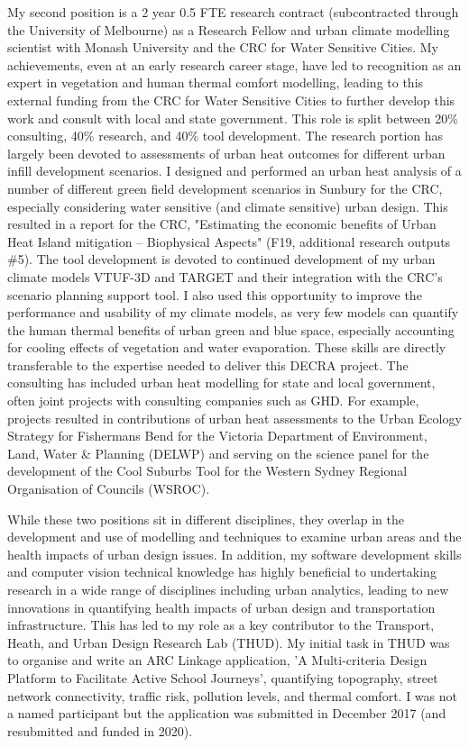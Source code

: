 My second position is a 2 year 0.5 FTE research contract (subcontracted through the University of Melbourne) as a Research Fellow and urban climate modelling scientist with Monash University and the CRC for Water Sensitive Cities. My achievements, even at an early research career stage, have led to recognition as an expert in vegetation and human thermal comfort modelling, leading to this external funding from the CRC for Water Sensitive Cities to further develop this work and consult with local and state government. This role is split between 20\% consulting, 40\% research, and 40\% tool development. The research portion has largely been devoted to assessments of urban heat outcomes for different urban infill development scenarios. I designed and performed an urban heat analysis of a number of different green field development scenarios in Sunbury for the CRC, especially considering water sensitive (and climate sensitive) urban design. This resulted in a report for the CRC, "Estimating the economic benefits of Urban Heat Island mitigation – Biophysical Aspects" (F19, additional research outputs \#5). The tool development is devoted to continued development of my urban climate models VTUF-3D and TARGET and their integration with the CRC's scenario planning support tool. I also used this opportunity to improve the performance and usability of my climate models, as very few models can quantify the human thermal benefits of urban green and blue space, especially accounting for cooling effects of vegetation and water evaporation. These skills are directly transferable to the expertise needed to deliver this DECRA project. The consulting has included urban heat modelling for state and local government, often joint projects with consulting companies such as GHD. For example, projects resulted in contributions of urban heat assessments to the Urban Ecology Strategy for Fishermans Bend for the Victoria Department of Environment, Land, Water \& Planning (DELWP) and serving on the science panel for the development of the Cool Suburbs Tool for the Western Sydney Regional Organisation of Councils (WSROC). 

While these two positions sit in different disciplines, they overlap in the development and use of modelling and techniques to examine urban areas and the health impacts of urban design issues. In addition, my software development skills and computer vision technical knowledge has highly beneficial to undertaking research in a wide range of disciplines including urban analytics, leading to new innovations in quantifying health impacts of urban design and transportation infrastructure. This has led to my role as a key contributor to the Transport, Heath, and Urban Design Research Lab (THUD). My initial task in THUD was to organise and write an ARC Linkage application, 'A Multi-criteria Design Platform to Facilitate Active School Journeys', quantifying topography, street network connectivity, traffic risk, pollution levels, and thermal comfort. I was not a named participant but the application was submitted in December 2017 (and resubmitted and funded in 2020). 

